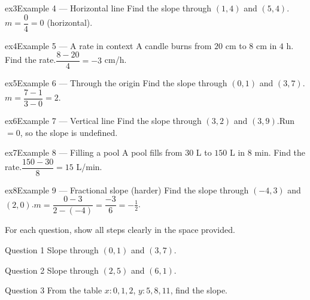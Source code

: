 \documentclass[11pt]{article}
\begin{document}
\begin{example}{ex3}{Example 4 --- Horizontal line}
Find the slope through $(1,4)$ and $(5,4)$.\soln $m=\dfrac{0}{4}=0$ (horizontal).
\end{example}

\begin{example}{ex4}{Example 5 --- A rate in context}
A candle burns from $20$ cm to $8$ cm in $4$ h. Find the rate.\soln $\dfrac{8-20}{4}=-3$ cm/h.
\end{example}

\begin{example}{ex5}{Example 6 --- Through the origin}
Find the slope through $(0,1)$ and $(3,7)$.\soln $m=\dfrac{7-1}{3-0}=2$.
\end{example}

\begin{example}{ex6}{Example 7 --- Vertical line}
Find the slope through $(3,2)$ and $(3,9)$.\soln Run $=0$, so the slope is undefined.
\end{example}

\begin{example}{ex7}{Example 8 --- Filling a pool}
A pool fills from $30$ L to $150$ L in $8$ min. Find the rate.\soln $\dfrac{150-30}{8}=15$ L/min.
\end{example}

\begin{example}{ex8}{Example 9 --- Fractional slope (harder)}
Find the slope through $(-4,3)$ and $(2,0)$.\soln $m=\dfrac{0-3}{2-(-4)}=\dfrac{-3}{6}=-\tfrac12$.
\end{example}

\clearpage
{}
For each question, show all steps clearly in the space provided.

\begin{qbox}{Question 1}
Slope through $(0,1)$ and $(3,7)$.\workspace{2.0cm}
\end{qbox}

\begin{qbox}{Question 2}
Slope through $(2,5)$ and $(6,1)$.\workspace{2.0cm}
\end{qbox}

\begin{qbox}{Question 3}
From the table $x:0,1,2$, $y:5,8,11$, find the slope.\workspace{2.0cm}
\end{qbox}
\end{document}
